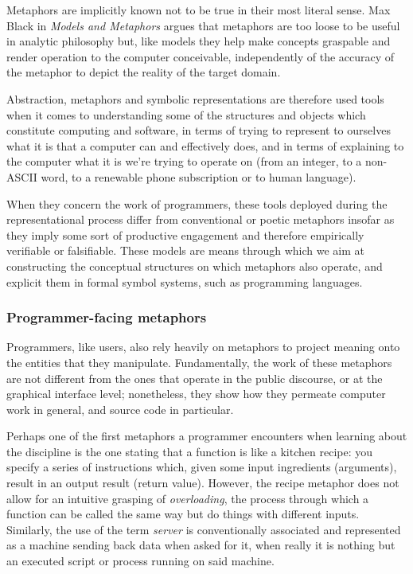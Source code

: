 Metaphors are implicitly known not to be true in their most literal sense. Max Black in \emph{Models and Metaphors} argues that metaphors are too loose to be useful in analytic philosophy but, like models they help make concepts graspable and render operation to the computer conceivable, independently of the accuracy of the metaphor to depict the reality of the target domain.

Abstraction, metaphors and symbolic representations are therefore used tools when it comes to understanding some of the structures and objects which constitute computing and software, in terms of trying to represent to ourselves what it is that a computer can and effectively does, and in terms of explaining to the computer what it is we're trying to operate on (from an integer, to a non-ASCII word, to a renewable phone subscription or to human language). 

When they concern the work of programmers, these tools deployed during the representational process differ from conventional or poetic metaphors insofar as they imply some sort of productive engagement and therefore empirically verifiable or falsifiable. These models are means through which we aim at constructing the conceptual structures on which metaphors also operate, and explicit them in formal symbol systems, such as programming languages.

\subsubsection{Programmer-facing metaphors}
\label{subsubsec:metaphors-programmers}

Programmers, like users, also rely heavily on metaphors to project meaning onto the entities that they manipulate. Fundamentally, the work of these metaphors are not different from the ones that operate in the public discourse, or at the graphical interface level; nonetheless, they show how they permeate computer work in general, and source code in particular.

Perhaps one of the first metaphors a programmer encounters when learning about the discipline is the one stating that a function is like a kitchen recipe: you specify a series of instructions which, given some input ingredients (arguments), result in an output result (return value). However, the recipe metaphor does not allow for an intuitive grasping of \emph{overloading}, the process through which a function can be called the same way but do things with different inputs. Similarly, the use of the term \emph{server} is conventionally associated and represented as a machine sending back data when asked for it, when really it is nothing but an executed script or process running on said machine.

